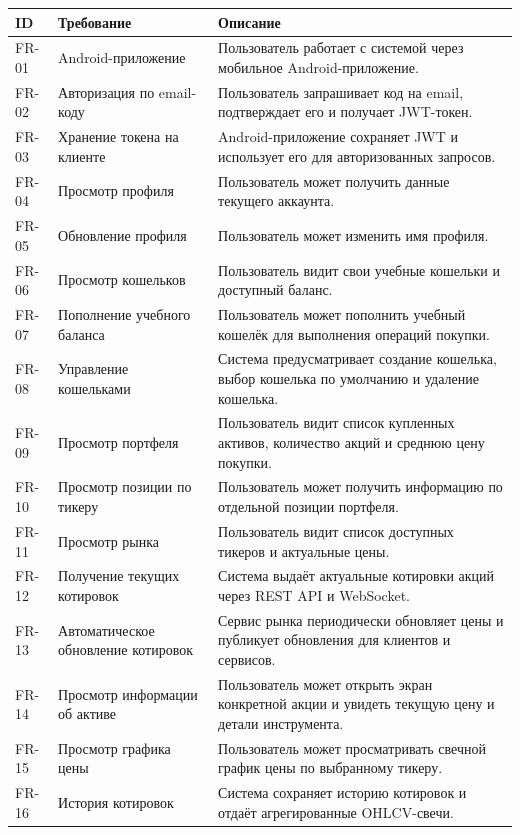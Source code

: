 \documentclass[12pt,a4paper]{article}
\begin{document}
{\small
\begin{longtable}{p{1.2cm}p{3cm}p{9.5cm}}
\toprule
\textbf{ID} & \textbf{Требование} & \textbf{Описание} \\
\midrule
\endhead
FR-01  & Android-приложение        & Пользователь работает с системой через мобильное Android-приложение. \\
FR-02  & Авторизация по email-коду & Пользователь запрашивает код на email, подтверждает его и получает JWT-токен. \\
FR-03  & Хранение токена на клиенте & Android-приложение сохраняет JWT и использует его для авторизованных запросов. \\
FR-04  & Просмотр профиля          & Пользователь может получить данные текущего аккаунта. \\
FR-05  & Обновление профиля        & Пользователь может изменить имя профиля. \\
FR-06  & Просмотр кошельков        & Пользователь видит свои учебные кошельки и доступный баланс. \\
FR-07  & Пополнение учебного баланса & Пользователь может пополнить учебный кошелёк для выполнения операций покупки. \\
FR-08  & Управление кошельками     & Система предусматривает создание кошелька, выбор кошелька по умолчанию и удаление кошелька. \\
FR-09  & Просмотр портфеля         & Пользователь видит список купленных активов, количество акций и среднюю цену покупки. \\
FR-10  & Просмотр позиции по тикеру & Пользователь может получить информацию по отдельной позиции портфеля. \\
FR-11  & Просмотр рынка            & Пользователь видит список доступных тикеров и актуальные цены. \\
FR-12  & Получение текущих котировок & Система выдаёт актуальные котировки акций через REST API и WebSocket. \\
FR-13  & Автоматическое обновление котировок & Сервис рынка периодически обновляет цены и публикует обновления для клиентов и сервисов. \\
FR-14  & Просмотр информации об активе & Пользователь может открыть экран конкретной акции и увидеть текущую цену и детали инструмента. \\
FR-15  & Просмотр графика цены     & Пользователь может просматривать свечной график цены по выбранному тикеру. \\
FR-16  & История котировок         & Система сохраняет историю котировок и отдаёт агрегированные OHLCV-свечи. \\

\end{longtable}}
\end{document}
